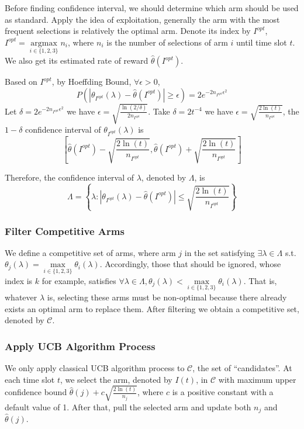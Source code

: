 \documentclass[11pt]{article}
\begin{document}
Before finding confidence interval, we should determine which arm should
be used as standard. Apply the idea of exploitation, generally the arm
with the most frequent selections is relatively the optimal arm. Denote
its index by \(I^{opt}\),
\(I^{opt}=\mathop{\arg\max}\limits_{i\in\{1,2,3\}}n_i\), where \(n_i\)
is the number of selections of arm \(i\) until time slot \(t\). We also
get its estimated rate of reward \(\hat{\theta}({I^{opt}})\).

Based on \(I^{opt}\), by Hoeffding Bound, \(\forall\epsilon>0\), \[
P(|\theta_{I^{opt}}(\lambda)-\hat{\theta}({I^{opt}})|\geqslant\epsilon)=2e^{-2n_{I^{opt}}\epsilon^2}
\] Let \(\delta=2e^{-2n_{I^{opt}}\epsilon^2}\) we have
\(\epsilon=\sqrt{\frac{\ln(2/\delta)}{2n_{I^{opt}}}}\). Take
\(\delta=2t^{-4}\) we have
\(\epsilon=\sqrt{\frac{2\ln(t)}{n_{I^{opt}}}}\), the \(1-\delta\)
confidence interval of \(\theta_{I^{opt}}(\lambda)\) is
\[\left[\hat{\theta}({I^{opt}})-\sqrt{\frac{2\ln(t)}{n_{I^{opt}}}},\hat{\theta}({I^{opt}})+\sqrt{\frac{2\ln(t)}{n_{I^{opt}}}}\right]\]

Therefore, the confidence interval of \(\lambda\), denoted by
\(\Lambda\), is \[
\Lambda=\left\{\lambda:|\theta_{I^{opt}}(\lambda)-\hat{\theta}({I^{opt}})|\leqslant\sqrt{\frac{2\ln(t)}{n_{I^{opt}}}}\right\}
\]

\hypertarget{filter-competitive-arms}{%
\subsubsection{Filter Competitive Arms}\label{filter-competitive-arms}}

We define a competitive set of arms, where arm \(j\) in the set
satisfying \(\exists\lambda\in\Lambda\) s.t.
\(\theta_j(\lambda)=\max\limits_{i\in\{1,2,3\}}\theta_i(\lambda)\).
Accordingly, those that should be ignored, whose index is \(k\) for
example, satisfies
\(\forall\lambda\in\Lambda,\theta_j(\lambda)<\max\limits_{i\in\{1,2,3\}}\theta_i(\lambda)\).
That is, whatever \(\lambda\) is, selecting these arms must be
non-optimal because there already exists an optimal arm to replace them.
After filtering we obtain a competitive set, denoted by \(\mathcal{C}\).

\hypertarget{apply-ucb-algorithm-process}{%
\subsubsection{Apply UCB Algorithm
Process}\label{apply-ucb-algorithm-process}}

We only apply classical UCB algorithm process to \(\mathcal{C}\), the
set of ``candidates''. At each time slot \(t\), we select the arm,
denoted by \(I(t)\), in \(\mathcal{C}\) with maximum upper confidence
bound \(\hat{\theta}(j)+c\sqrt{\frac{2\ln(t)}{n_j}}\), where \(c\) is a
positive constant with a default value of 1. After that, pull the
selected arm and update both \(n_j\) and \(\hat{\theta}(j)\).
\end{document}
